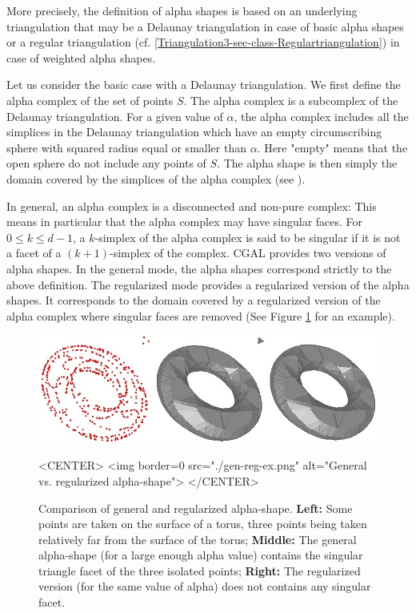 More precisely, the definition of alpha shapes is based on an underlying
triangulation that may be a Delaunay triangulation 
in case of basic alpha shapes 
or a regular triangulation 
(cf. \ref{Triangulation3-sec-class-Regulartriangulation})
in case of weighted alpha shapes.

Let us consider the basic case with a Delaunay triangulation.
We first define the alpha complex  of the set of points $S$. 
The  alpha complex is a subcomplex 
of the Delaunay triangulation.
For a given value of $\alpha$, the alpha complex includes
all the simplices in the Delaunay triangulation which have
an empty  circumscribing sphere with squared radius equal or smaller than $\alpha$.
Here "empty" means  that the open sphere 
do not include  any points of $S$.
The alpha shape is then simply the domain covered by the simplices
of the alpha complex (see \cite{em-tdas-94}).

In general, an alpha complex is a disconnected and non-pure complex:
This means in particular that the alpha complex may have
singular faces.  For $0 \leq k \leq d-1$,
a $k$-simplex of the alpha complex  is said to be
singular if it is not a facet of a $(k+1)$-simplex of the complex.
CGAL provides two versions of alpha shapes. In the general mode,
the alpha shapes correspond strictly to the above definition.
The regularized mode provides a regularized version of the alpha shapes.
It corresponds to the domain covered by a regularized version
of the alpha complex where singular faces are removed 
(See Figure \ref{fig-gen-reg-ex} for an example).


\begin{figure}
\begin{ccTexOnly}
\begin{center}
\includegraphics[width=15cm]{Alpha_shapes_3/gen-reg-ex.png}
\end{center}
\end{ccTexOnly}
\begin{ccHtmlOnly}
<CENTER>
<img border=0 src="./gen-reg-ex.png" alt="General vs. regularized alpha-shape">
</CENTER>
\end{ccHtmlOnly}

\caption{Comparison of general and regularized alpha-shape.
\textbf{Left:} Some points are taken on the surface of a torus, 
three points being taken relatively
far from the surface of the torus;
\textbf{Middle:} The general alpha-shape (for a large enough alpha value)
contains the singular triangle facet of the three isolated points;
\textbf{Right:} The regularized version (for the same value of alpha) does not contains any singular facet.
\label{fig-gen-reg-ex}}
\end{figure}






